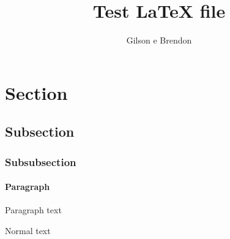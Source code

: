 \documentclass[12pt]{article}
\title{Test LaTeX file}
\author{Gilson e Brendon}
\begin{document}
\maketitle

\section{Section}
\subsection{Subsection}
\subsubsection{Subsubsection}
\paragraph{Paragraph} Paragraph text 

Normal text
\end{document}

